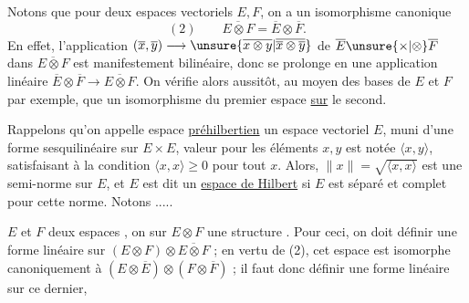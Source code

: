 Notons que pour deux espaces vectoriels $E,F$, on a un isomorphisme canonique
\[
(2)\qquad\overline{E\otimes F}=\overline E\otimes\overline F.
\]
En effet, l'application $(\overline x,\overline y)\longrightarrow\unsure{\overline{x\otimes y}|\overline{\overline x\otimes\overline y}}$ de $\overline E\unsure{\times|\otimes}\overline F$ dans $\overline{E\otimes F}$ est manifestement bilinéaire, donc se prolonge en une application linéaire $\overline E\otimes\overline F\longrightarrow\overline{E\otimes F}$.
On vérifie alors aussitôt, au moyen des bases de $E$ et $F$ par exemple, que  un isomorphisme du premier espace \uline{sur} le second.

 Rappelons qu'on appelle espace \uline{préhilbertien} un espace vectoriel $E$, muni d'une forme sesquilinéaire sur $E\times E$,   valeur pour les éléments $x,y$ est notée $\langle x,y\rangle$, satisfaisant à la condition $\langle x,x\rangle\geq0$ pour tout $x$. Alors,
$\|x\|=\sqrt{\langle x,x\rangle}$ est une semi-norme sur $E$, et $E$ est dit un \uline{espace de Hilbert} si $E$ est séparé et complet pour cette norme.
Notons .....


 $E$ et $F$ deux espaces  , on  sur $E\otimes F$ une structure   .
Pour ceci, on doit définir une forme linéaire sur $(E\otimes F)\otimes\overline{E\otimes F}$ ;  en vertu de (2),  cet espace est isomorphe canoniquement à $(E\otimes\overline E)\otimes(F\otimes\overline F)$ ; il faut donc définir une forme linéaire sur ce dernier, 
